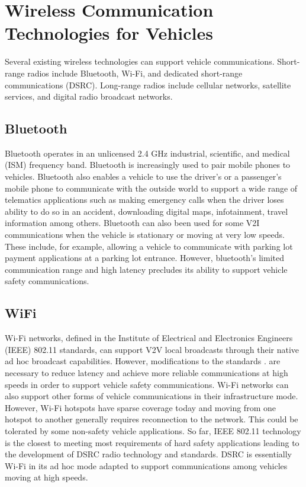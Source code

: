 \documentclass[12pt]{report}
\begin{document}
\section{Wireless Communication Technologies for Vehicles}
Several existing wireless technologies can support vehicle communications. Short-range radios include Bluetooth, Wi-Fi, and dedicated short-range communications (DSRC). Long-range radios include cellular networks, satellite services, and digital radio broadcast networks.

	\subsection{Bluetooth}
	Bluetooth operates in an unlicensed 2.4 GHz industrial,	scientific, and medical (ISM) frequency band. Bluetooth is increasingly used to pair mobile phones to vehicles. Bluetooth also enables a vehicle to use the driver’s or a passenger’s
	mobile phone to communicate with the outside world to support a wide range of telematics applications such as making emergency calls when the driver loses ability to do so in an accident, downloading digital maps, infotainment, travel information among others. Bluetooth can also been used for some V2I communications
	when the vehicle is stationary or moving at very low speeds. These include, for example, allowing a vehicle to communicate with parking lot payment applications at a parking lot entrance. However, bluetooth’s limited communication range and high latency precludes its ability to support vehicle safety communications.
	
	\subsection{WiFi}
	Wi-Fi networks, defined in the Institute of Electrical and Electronics Engineers (IEEE) 802.11 standards, can support V2V local broadcasts through their native ad hoc broadcast capabilities. However, modifications to the standards \cite{protocols}.
	are necessary to reduce latency and achieve more reliable communications at high speeds in order to support vehicle safety communications. Wi-Fi networks can also support other forms of vehicle communications in their infrastructure mode. However, Wi-Fi hotspots have sparse coverage today and
	moving from one hotspot to another generally requires reconnection to the network. This could be tolerated by some non-safety vehicle applications. So far, IEEE 802.11 technology is the closest to meeting most requirements
	of hard safety applications leading to the development of DSRC radio technology and standards. DSRC is essentially Wi-Fi in its ad hoc mode adapted	to support communications among vehicles moving at high speeds.
	
\end{document}
